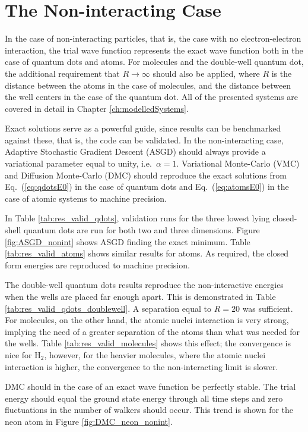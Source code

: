\section{The Non-interacting Case}

In the case of non-interacting particles, that is, the case with no electron-electron interaction, the trial wave function represents the exact wave function both in the case of quantum dots and atoms. For molecules and the double-well quantum dot, the additional requirement that $R\to\infty$ should also be applied, where $R$ is the distance between the atoms in the case of molecules, and the distance between the well centers in the case of the quantum dot. All of the presented systems are covered in detail in Chapter \ref{ch:modelledSystems}.

Exact solutions serve as a powerful guide, since results can be benchmarked against these, that is, the code can be validated. In the non-interacting case, Adaptive Stochastic Gradient Descent (ASGD) should always provide a variational parameter equal to unity, i.e.~$\alpha=1$. Variational Monte-Carlo (VMC) and Diffusion Monte-Carlo (DMC) should reproduce the exact solutions from Eq.~(\ref{eq:qdotsE0}) in the case of quantum dots and Eq.~(\ref{eq:atomsE0}) in the case of atomic systems to machine precision. 

In Table \ref{tab:res_valid_qdots}, validation runs for the three lowest lying closed-shell quantum dots are run for both two and three dimensions. Figure \ref{fig:ASGD_nonint} shows ASGD finding the exact minimum. Table \ref{tab:res_valid_atoms} shows similar results for atoms. As required, the closed form energies are reproduced to machine precision.

The double-well quantum dots results reproduce the non-interactive energies when the wells are placed far enough apart. This is demonstrated in Table \ref{tab:res_valid_qdots_doublewell}. A separation equal to $R = 20$ was sufficient. For molecules, on the other hand, the atomic nuclei interaction is very strong, implying the need of a greater separation of the atoms than what was needed for the wells. Table \ref{tab:res_valid_molecules} shows this effect; the convergence is nice for $\mathrm{H_2}$, however, for the heavier molecules, where the atomic nuclei interaction is higher, the convergence to the non-interacting limit is slower.

DMC should in the case of an exact wave function be perfectly stable. The trial energy should equal the ground state energy through all time steps and zero fluctuations in the number of walkers should occur. This trend is shown for the neon atom in Figure \ref{fig:DMC_neon_nonint}.

